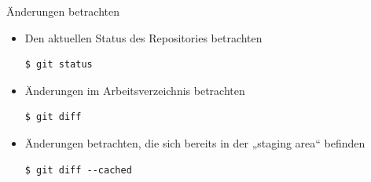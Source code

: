 \begin{frame}[fragile]{Änderungen betrachten}
  \begin{itemize}
    \item Den aktuellen Status des Repositories betrachten
    \begin{lstlisting}
$ git status
    \end{lstlisting}
    \item Änderungen im Arbeitsverzeichnis betrachten
    \begin{lstlisting}
$ git diff
    \end{lstlisting}
    \item Änderungen betrachten, die sich bereits in der „staging area“ befinden
    \begin{lstlisting}
$ git diff --cached
    \end{lstlisting}
  \end{itemize}
\end{frame}

